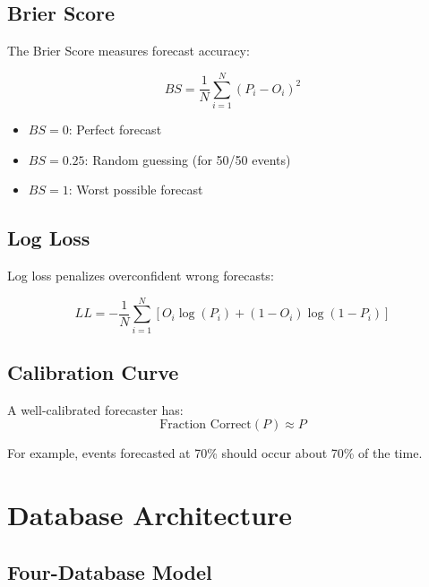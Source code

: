 \subsection{Brier Score}

The Brier Score measures forecast accuracy:

\[
BS = \frac{1}{N} \sum_{i=1}^{N} (P_i - O_i)^2
\]

\begin{itemize}
    \item $BS = 0$: Perfect forecast
    \item $BS = 0.25$: Random guessing (for 50/50 events)
    \item $BS = 1$: Worst possible forecast
\end{itemize}

\subsection{Log Loss}

Log loss penalizes overconfident wrong forecasts:

\[
LL = -\frac{1}{N} \sum_{i=1}^{N} [O_i \log(P_i) + (1-O_i) \log(1-P_i)]
\]

\subsection{Calibration Curve}

A well-calibrated forecaster has:
\[
\text{Fraction Correct}(P) \approx P
\]

For example, events forecasted at 70\% should occur about 70\% of the time.

\section{Database Architecture}
\label{sec:fct-database}

\subsection{Four-Database Model}

